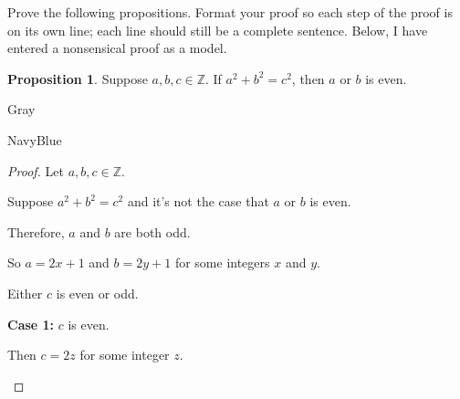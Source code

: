 \documentclass[12pt]{amsart}
\theoremstyle{named}
\newenvironment{prf}
{\medskip\begin{color}{Gray}\begin{framed}\begin{color}{NavyBlue}\begin{proof}[Proof]
\doublespacing}
{\end{proof}\end{color}\end{framed}\end{color}\medskip}
\theoremstyle{definition}
\newtheorem{proposition}{Proposition}
\newcommand{\Z}{\mathbb Z}
\begin{document}
Prove the following propositions. Format your proof so each step of the proof is on its own line; each line should still be a complete sentence. Below, I have entered a nonsensical proof as a model.

\begin{proposition}
	Suppose $a,b,c\in\Z$.
	If $a^2+b^2=c^2$, then $a$ or $b$ is even.
\end{proposition}

\begin{prf}
	\phantom{ }


		

			





			
		
	Let $a,b,c \in \mathbb Z$. 
	
	Suppose $a^2 + b^2 = c^2$ and it's 
	not the case that $a$ or $b$ is even.

	Therefore, $a$ and $b$ are both odd.

	So $a = 2x + 1$ and $b = 2y + 1$ for some integers $x$ and $y$.

	Either $c$ is even or odd.

	\textbf{Case 1:} $c$ is even.
	\begin{adjustwidth}{2em}{0em} 
		Then $c = 2z$ for some integer $z$.


\end{adjustwidth}
\end{prf}
\end{document}
